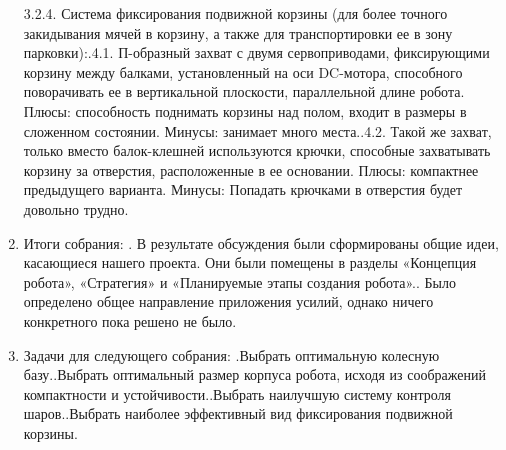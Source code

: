 \documentclass[12pt]{article}
\begin{document}
\begin{enumerate}
	      	3.2.4.	Система фиксирования подвижной корзины (для более точного закидывания мячей в корзину, а также для транспортировки ее в зону парковки):.4.1.	П-образный захват с двумя сервоприводами, фиксирующими корзину между балками, установленный на оси DC-мотора, способного поворачивать ее в вертикальной плоскости, параллельной длине робота. Плюсы: способность поднимать корзины над полом, входит в размеры в сложенном состоянии. Минусы: занимает много места..4.2.	Такой же захват, только вместо балок-клешней используются крючки, способные захватывать корзину за отверстия, расположенные в ее основании. Плюсы: компактнее предыдущего варианта. Минусы: Попадать крючками в отверстия будет довольно трудно.\newline
	        \item Итоги собрания:
	        .	В результате обсуждения были сформированы общие идеи, касающиеся нашего проекта. Они были помещены в разделы «Концепция робота»,  «Стратегия» и «Планируемые этапы создания робота»..	Было определено общее направление приложения усилий, однако ничего конкретного пока решено не было.
	        \newline
	        \item Задачи для следующего собрания:
	        .Выбрать оптимальную колесную базу..Выбрать оптимальный размер корпуса робота, исходя из соображений компактности и устойчивости..Выбрать наилучшую систему контроля шаров..Выбрать наиболее эффективный вид фиксирования подвижной корзины.\newline      
	      \end{enumerate}
\end{document}
